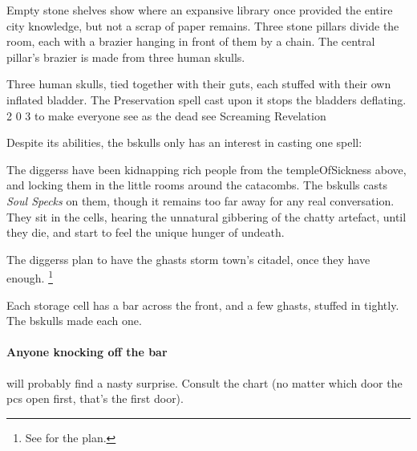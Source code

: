 \begin{multicols}{2}
\begin{boxtext}
  Empty stone shelves show where an expansive library once provided the entire city knowledge, but not a scrap of paper remains.
  Three stone pillars divide the room, each with a brazier hanging in front of them by a chain.
  The central pillar's brazier is made from three human skulls.
\end{boxtext}

  {Three human skulls, tied together with their guts, each stuffed with their own inflated bladder.
  The Preservation spell cast upon it stops the bladders deflating.}%
  {2}%
  {0}%
  {3}%
  {to make everyone see as the dead see}%
  {Screaming Revelation}%
  {
    \setcounter{Fate}{2}
    \setcounter{Air}{2}
    \setcounter{Water}{1}
    \setcounter{Vigilance}{1}
    \setcounter{Academics}{1}
  }%

Despite its abilities, the \gls{bskulls} only has an interest in casting one spell:

\revelationSpell


\begin{exampletext}
  The \glspl{diggers} have been kidnapping rich people from the \gls{templeOfSickness} above, and locking them in the little rooms around the catacombs.
  The \gls{bskulls} casts \textit{Soul Specks} on them, though it remains too far away for any real conversation.
  They sit in the cells, hearing the unnatural gibbering of the chatty \gls{artefact}, until they die, and start to feel the unique hunger of undeath.

  The \glspl{diggers} plan to have the ghasts storm \gls{town}'s citadel, once they have enough.%
  \footnote{See  for the plan.}
\end{exampletext}

Each storage cell has a bar across the front, and a few ghasts, stuffed in tightly.
The \gls{bskulls} made each one.

\paragraph{Anyone knocking off the bar}
will probably find a nasty surprise.
Consult the chart (no matter which door the \glspl{pc} open first, that's the first door).


\end{multicols}
